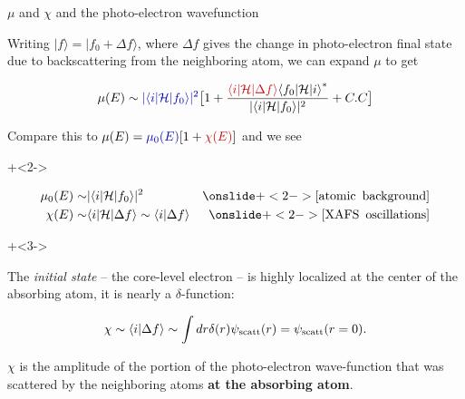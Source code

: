 \begin{slide}{$\mu$ and $\chi$ and the photo-electron wavefunction}

  \begin{cenpage}{125mm}

    Writing $ {| f \rangle = | f_0 + \Delta f \rangle} $, where $\Delta f$
    gives the change in photo-electron final state due to backscattering
    from the neighboring atom, we can expand $\mu$ to get

    \[ {\mu(E) \sim {\Blue{| \langle i | {\cal{H}} | f_0 \rangle |^2}}
    \bigl[ 1 +
    {   \frac{  {\Red{\langle i | {\cal{H}} | \Delta f \rangle}}
        {\langle f_0 | {\cal{H}} | i \rangle }^{*}
      } { | \langle i | {\cal{H}} | f_0 \rangle |^2 } }  + C.C \bigr] }  \]


\vmm   Compare this to $ \mu(E) = {\Blue{\mu_0(E)}} [ 1 +
  {\Red{\chi(E)}}] $ and we see \vspace{-2mm}

  {
    \onslide+<2->
    \begin{center} \begin{eqnarray*}
      {\mu_0(E) } \sim&  {| \langle i | {\cal{H}} | f_0 \rangle |^2}  &
      \onslide+<2->   {\mathrm{[atomic \,\,\,background]} } \\
      \chi(E) \sim& \langle i | {\cal{H}} | \Delta f \rangle \sim
      \langle i | \Delta f \rangle  &
      \onslide+<2->  {\mathrm{[XAFS \,\,\,oscillations]}}
    \end{eqnarray*}\end{center} 
  }

  {
    \onslide+<3->
    {The {\emph{initial state}} -- the core-level electron -- is highly
      localized at the center of the absorbing atom,  it is nearly a  $\delta$-function:
      
    \[ {\chi \sim \langle i | \Delta f \rangle \sim \int dr \delta(r)
      \psi_{\rm{scatt}}(r)  =  \psi_{\rm{scatt}}(r=0). }\]


\vspace{-2mm}

  \begin{center}
    \begin{postitbox}{92mm}\vspace{-2mm}\justify
      $\chi$ is the amplitude of the portion of the photo-electron
      wave-function that was scattered by the neighboring atoms {\bf{at the
      absorbing atom}}.

      \end{postitbox}
    \end{center}

} }
\end{cenpage}


\end{slide}
